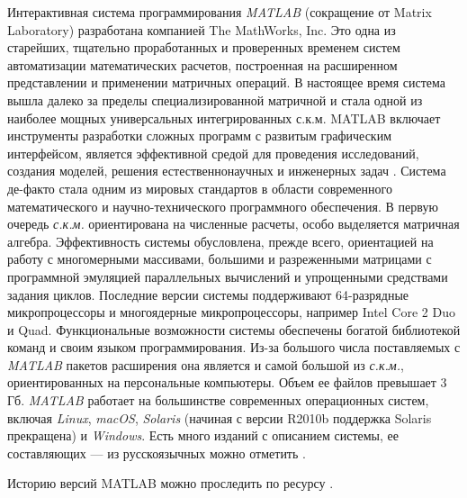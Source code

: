 Интерактивная система программирования \textit{MATLAB} (сокращение от Matrix Laboratory) разработана компанией The MathWorks, Inc. Это одна из старейших, тщательно проработанных и проверенных временем систем автоматизации математических расчетов, построенная на расширенном представлении и применении матричных операций. В настоящее время система вышла далеко за пределы специализированной матричной и стала одной из наиболее мощных универсальных интегрированных с.к.м. MATLAB включает инструменты разработки сложных программ с развитым графическим интерфейсом, является эффективной средой для проведения исследований, создания моделей, решения естественнонаучных и инженерных задач . Система де-факто стала одним из мировых стандартов в области современного математического и научно-технического программного обеспечения. В первую очередь \textit{с.к.м.} ориентирована на численные расчеты, особо выделяется матричная алгебра. Эффективность системы обусловлена, прежде всего, ориентацией на работу с многомерными массивами, большими и разреженными матрицами с программной эмуляцией параллельных вычислений и упрощенными средствами задания циклов. Последние версии системы поддерживают 64-разрядные микропроцессоры и многоядерные микропроцессоры, например Intel Core 2 Duo и Quad. Функциональные возможности системы обеспечены богатой библиотекой команд и своим языком программирования. Из-за большого числа поставляемых с \textit{MATLAB} пакетов расширения она является и самой большой из \textit{с.к.м.}, ориентированных на персональные компьютеры. Объем ее файлов превышает 3 Гб. 
\textit{MATLAB} работает на большинстве современных операционных систем, включая \textit{Linux}, \textit{macOS}, \textit{Solaris} (начиная с версии R2010b поддержка Solaris прекращена) и \textit{Windows}. 
Есть много изданий с описанием системы, ее составляющих --- из русскоязычных можно отметить .

Историю версий MATLAB можно проследить по ресурсу .

